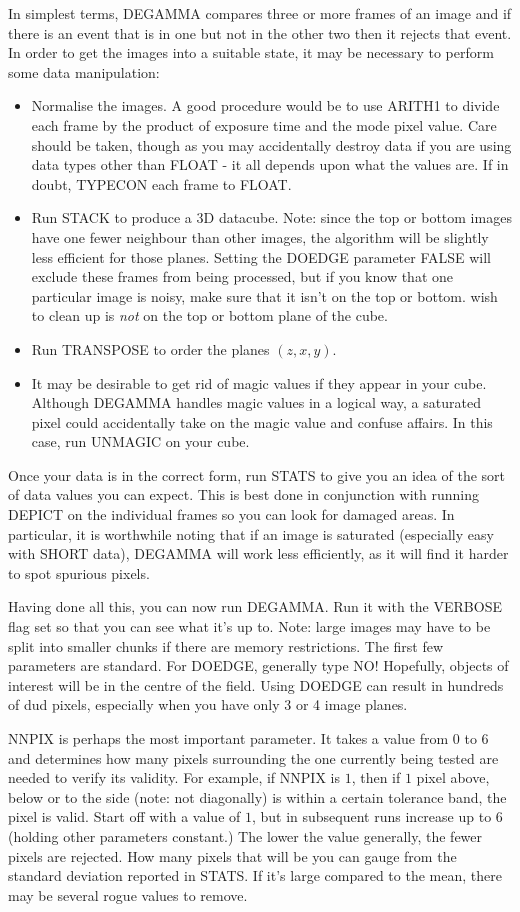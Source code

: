 In simplest terms, DEGAMMA compares three or more frames of an image and if
there is an event that is in one but not in the other two then it rejects that
event. In order to get the images into a suitable state, it may be necessary to
perform some data manipulation:
\begin{itemize}
\item Normalise the images. A good procedure would be to use ARITH1 to divide
each frame by the product of exposure time and the mode pixel value. Care
should be taken, though as you may accidentally destroy data if you are using
data types other than FLOAT - it all depends upon what the values are. If in
doubt, TYPECON each frame to FLOAT.
\item Run STACK to produce a 3D datacube. Note: since the top or bottom images
have one fewer neighbour than other images, the algorithm will be slightly less 
efficient for those planes. Setting the DOEDGE parameter FALSE will exclude 
these frames from
being processed, but if you know that one particular image is noisy, make sure
that it isn't on the top or bottom.  
wish to clean up is {\em not} on the top or bottom plane of the cube.
\item Run TRANSPOSE to order the planes $(z,x,y)$.
\item It may be desirable to get rid of magic values if they appear in your
cube. Although DEGAMMA handles magic values in a logical way, a saturated pixel
could accidentally take on the magic value and confuse affairs. In this case,
run UNMAGIC on your cube. 
\end{itemize}
Once your data is in the correct form, run STATS to give you an idea of the
sort of data values you can expect. This is best done in conjunction with
running DEPICT on the individual frames so you can look for damaged areas. In
particular, it is worthwhile noting that if an image is saturated (especially
easy with SHORT data), DEGAMMA will work less efficiently, as it will find it
harder to spot spurious pixels. 

Having done all this, you can now run DEGAMMA. Run it with the VERBOSE flag set
so that you can see what it's up to. Note: large images may have to be split
into smaller chunks if there are memory restrictions. The first few parameters
are standard. For DOEDGE, generally type NO! Hopefully, objects of interest
will be in the centre of the field. Using DOEDGE can result in hundreds of dud
pixels, especially when you have only 3 or 4 image planes. 

NNPIX is perhaps the most important parameter. It takes a value from $0$ to $6$
and determines how many pixels surrounding the one currently being tested are
needed to verify its validity. For example, if NNPIX is $1$, then if $1$ pixel
above, below or to the side (note: not diagonally) is within a certain
tolerance band, the pixel is valid. Start off with a value of $1$, but in
subsequent runs increase up to $6$ (holding other parameters constant.) The
lower the value generally, the fewer pixels are rejected. How many pixels that
will be you can gauge from the standard deviation reported in STATS. If it's
large compared to the mean, there may be several rogue values to remove.

